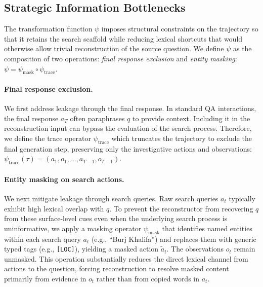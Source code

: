 \subsection{Strategic Information Bottlenecks}
The transformation function $\psi$ imposes structural constraints on the trajectory so that it retains the search scaffold while reducing lexical shortcuts that would otherwise allow trivial reconstruction of the source question.
We define $\psi$ as the composition of two operations: \emph{final response exclusion} and \emph{entity masking}: $\psi = \psi_{\text{mask}} \circ \psi_{\text{trace}}$.

\paragraph{Final response exclusion.}
We first address leakage through the final response. In standard QA interactions, the final response $a_T$ often paraphrases $q$ to provide context. Including it in the reconstruction input can bypass the evaluation of the search process. Therefore, we define the trace operator $\psi_{\text{trace}}$ which truncates the trajectory to exclude the final generation step, preserving only the investigative actions and observations: $\psi_{\text{trace}}(\tau) = (a_1, o_1, \ldots, a_{T-1}, o_{T-1})$.

\paragraph{Entity masking on search actions.}
We next mitigate leakage through search queries. Raw search queries $a_t$ typically exhibit high lexical overlap with $q$. To prevent the reconstructor from recovering $q$ from these surface-level cues even when the underlying search process is uninformative, we apply a masking operator $\psi_{\text{mask}}$ that identifies named entities within each search query $a_t$ (e.g., ``Burj Khalifa'') and replaces them with generic typed tags (e.g., \texttt{[LOC]}), yielding a masked action $\tilde{a}_t$. The observations $o_t$ remain unmasked. This operation substantially reduces the direct lexical channel from actions to the question, forcing reconstruction to resolve masked content primarily from evidence in $o_t$ rather than from copied words in $a_t$.

